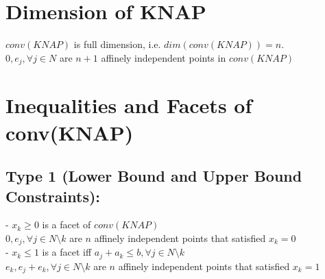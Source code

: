 			\section{Dimension of KNAP}
				$conv(KNAP)$ is full dimension, i.e. $dim(conv(KNAP))=n$.\\
				 $0, e_j, \forall j\in N$ are $n + 1$ affinely independent points in $conv(KNAP)$\\

			\section{Inequalities and Facets of conv(KNAP)}
				\subsection{Type 1 (Lower Bound and Upper Bound Constraints):}
					- $x_k\ge 0$ is a facet of $conv(KNAP)$\\
					 $0, e_j, \forall j\in N\setminus k$ are $n$ affinely independent points that satisfied $x_k=0$\\
					- $x_k\le 1$ is a facet iff $a_j + a_k \le b, \forall j\in N \setminus k$\\
					 $e_k, e_j+e_k, \forall j \in N\setminus k$ are $n$ affinely independent points that satisfied $x_k = 1$


